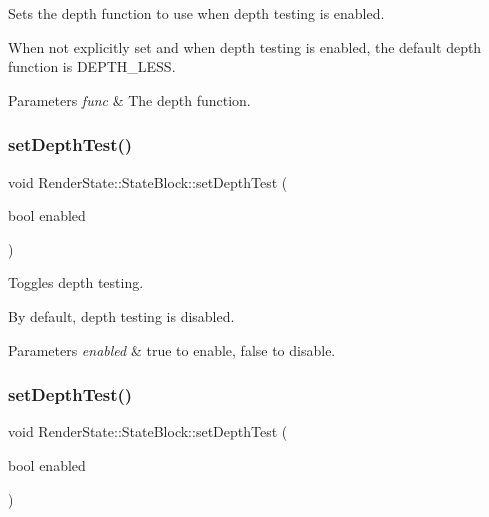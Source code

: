 Sets the depth function to use when depth testing is enabled.

When not explicitly set and when depth testing is enabled, the default depth function is D\+E\+P\+T\+H\+\_\+\+L\+E\+SS.


\begin{DoxyParams}{Parameters}
{\em func} & The depth function. \\
\hline
\end{DoxyParams}
\mbox{\label{classRenderState_1_1StateBlock_a3429ac03013bdc1826b578f772d88992}} 
\subsubsection{\texorpdfstring{set\+Depth\+Test()}{setDepthTest()}\hspace{0.1cm}{\footnotesize\ttfamily [1/2]}}
{\footnotesize\ttfamily void Render\+State\+::\+State\+Block\+::set\+Depth\+Test (\begin{DoxyParamCaption}\item[{bool}]{enabled }\end{DoxyParamCaption})}

Toggles depth testing.

By default, depth testing is disabled.


\begin{DoxyParams}{Parameters}
{\em enabled} & true to enable, false to disable. \\
\hline
\end{DoxyParams}
\mbox{\label{classRenderState_1_1StateBlock_a3429ac03013bdc1826b578f772d88992}} 
\subsubsection{\texorpdfstring{set\+Depth\+Test()}{setDepthTest()}\hspace{0.1cm}{\footnotesize\ttfamily [2/2]}}
{\footnotesize\ttfamily void Render\+State\+::\+State\+Block\+::set\+Depth\+Test (\begin{DoxyParamCaption}\item[{bool}]{enabled }\end{DoxyParamCaption})}

